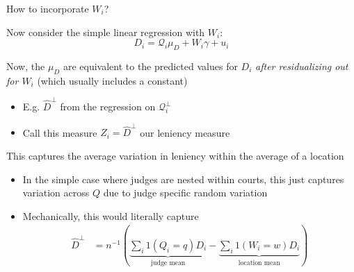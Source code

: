 \documentclass[notes,11pt, aspectratio=169]{beamer}
\newenvironment{wideitemize}{\itemize\addtolength{\itemsep}{10pt}}{\enditemize}
\begin{document}
\begin{frame}{How to incorporate $W_{i}$?}
  \begin{wideitemize}
  \item Now consider the simple linear regression with $W_{i}$:
    \begin{equation*}
      D_{i} = \mathcal{Q}_{i}\mu_{D} + W_{i}\gamma +  u_{i}
    \end{equation*}
  \item Now, the $\mu_{D}$ are equivalent to the predicted values for
    $D_{i}$ \emph{after residualizing out for $W_{i}$} (which usually
    includes a constant)
    \begin{itemize}
    \item E.g. $\hat{D}^{\perp}$ from the regression on $\mathcal{Q}_{i}^{\perp}$
    \item Call this measure $Z_{i} = \hat{D}^{\perp}$ our leniency measure
    \end{itemize}
  \item This captures the average variation in leniency within the average of a location
    \begin{itemize}
    \item In the simple case where judges are nested within courts,
      this just captures variation across $Q$ due to judge specific
      random variation
    \item Mechanically, this would literally capture
      \begin{align*}
        \hat{D}^{\perp} &= n^{-1}\left(\underbrace{\sum_{i}1(Q_{i} = q)D_{i}}_{\text{judge mean}} - \underbrace{\sum_{i}1(W_{i} = w)D_{i}}_{\text{location mean}}\right)
      \end{align*}
    \end{itemize}
  \end{wideitemize}
\end{frame}
\end{document}
